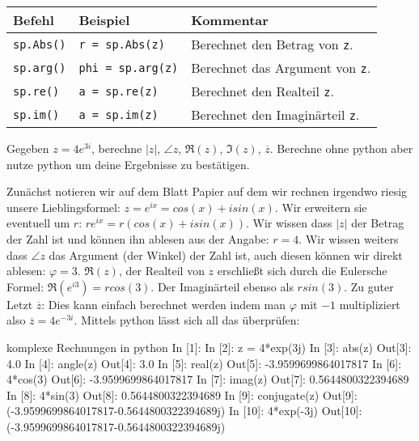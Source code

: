 \begin{table}[H]
    \centering
    \begin{tabular}{|p{3cm}|p{6cm}|p{6cm}|}
        \hline
    \textbf{Befehl} & \textbf{Beispiel} & \textbf{Kommentar} \\ \hline
    \texttt{sp.Abs()} & \texttt{r = sp.Abs(z)} & Berechnet den Betrag von \texttt{z}. \\ \hline
    \texttt{sp.arg()} & \texttt{phi = sp.arg(z)} & Berechnet das Argument von \texttt{z}. \\ \hline
    \texttt{sp.re()} & \texttt{a = sp.re(z)} & Berechnet den Realteil \texttt{z}. \\ \hline
    \texttt{sp.im()} & \texttt{a = sp.im(z)} & Berechnet den Imaginärteil \texttt{z}. \\ \hline

    \end{tabular}
\end{table}


\begin{question}

Gegeben $z = 4e^{3i}$, berechne $|z|$, $\angle z$, $\Re (z)$, $\Im (z)$, $\overline{z}$. Berechne ohne python aber nutze python um deine Ergebnisse zu bestätigen.
\end{question}


\begin{answer}
	Zunächst notieren wir auf dem Blatt Papier auf dem wir rechnen irgendwo riesig unsere Lieblingsformel: $z = e^{ix} = cos(x) + i sin(x)$.
	Wir erweitern sie eventuell um $r$: $re^{ix} = r(cos(x) + i sin(x))$.
	Wir wissen dass $|z|$ der Betrag der Zahl ist und können ihn ablesen aus der Angabe: $r = 4$.
	Wir wissen weiters dass $\angle z$ das Argument (der Winkel) der Zahl ist, auch diesen können wir direkt ablesen: $\varphi = 3$.
	$\Re (z)$, der Realteil von $z$ erschließt sich durch die Eulersche Formel: $\Re (e^{i3}) = r cos(3)$. Der Imaginärteil ebenso als $r sin(3)$.
	Zu guter Letzt $\overline{z}$: Dies kann einfach berechnet werden indem man $\varphi$ mit $-1$ multipliziert also $\overline{z} = 4e^{-3i}$. 
	Mittels python lässt sich all das überprüfen:
	\begin{python}{komplexe Rechnungen in python}
In [1]: %
In [2]: z = 4*exp(3j)
In [3]: abs(z)
Out[3]: 4.0
In [4]: angle(z)
Out[4]: 3.0
In [5]: real(z)
Out[5]: -3.9599699864017817
In [6]: 4*cos(3)
Out[6]: -3.9599699864017817
In [7]: imag(z)
Out[7]: 0.5644800322394689
In [8]: 4*sin(3)
Out[8]: 0.5644800322394689
In [9]: conjugate(z)
Out[9]: (-3.9599699864017817-0.5644800322394689j)
In [10]: 4*exp(-3j)
Out[10]: (-3.9599699864017817-0.5644800322394689j)

	\end{python}


\end{answer}


